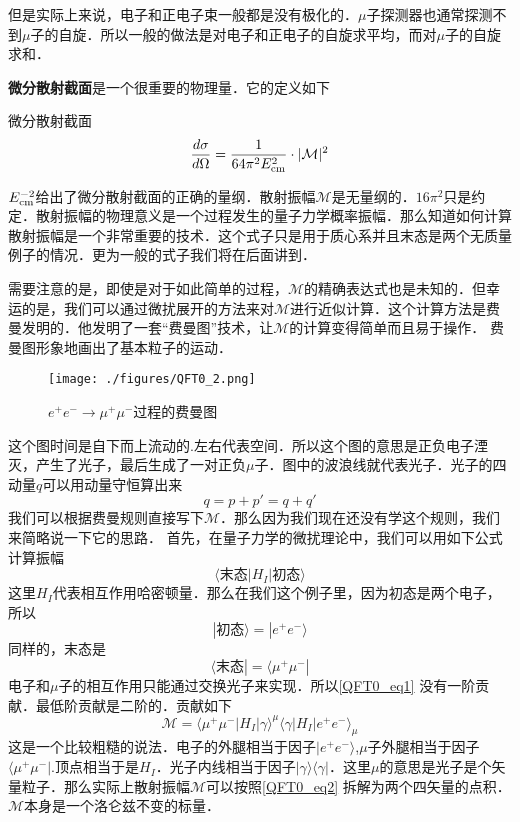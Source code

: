 但是实际上来说，电子和正电子束一般都是没有极化的．$\mu$子探测器也通常探测不到$\mu$子的自旋．所以一般的做法是对电子和正电子的自旋求平均，而对$\mu$子的自旋求和．

\textbf{微分散射截面}是一个很重要的物理量．它的定义如下
\begin{definition}{微分散射截面}
\begin{equation}
\frac{d\sigma}{d\Omega} = \frac{1}{64\pi^2E_{\rm cm}^2}\cdot |\mathcal M|^2
\end{equation}
\end{definition}
$E_{\rm cm}^{-2}$给出了微分散射截面的正确的量纲．散射振幅$\mathcal M$是无量纲的．$16\pi^2$只是约定．散射振幅的物理意义是一个过程发生的量子力学概率振幅．那么知道如何计算散射振幅是一个非常重要的技术．这个式子只是用于质心系并且末态是两个无质量例子的情况．更为一般的式子我们将在后面讲到．

需要注意的是，即使是对于如此简单的过程，$\mathcal M$的精确表达式也是未知的．但幸运的是，我们可以通过微扰展开的方法来对$\mathcal M$进行近似计算．这个计算方法是费曼发明的．他发明了一套“费曼图”技术，让$\mathcal M$的计算变得简单而且易于操作．
费曼图形象地画出了基本粒子的运动．

\begin{figure}[ht]
\centering
\texttt{[image: ./figures/QFT0\_2.png]}
\caption{$e^+e^-\rightarrow\mu^+\mu^-$过程的费曼图} \label{QFT0_fig2}
\end{figure}

这个图时间是自下而上流动的.左右代表空间．所以这个图的意思是正负电子湮灭，产生了光子，最后生成了一对正负$\mu$子．图中的波浪线就代表光子．光子的四动量$q$可以用动量守恒算出来
\begin{equation}
q=p+p'=q+q'
\end{equation}
我们可以根据费曼规则直接写下$\mathcal M$．那么因为我们现在还没有学这个规则，我们来简略说一下它的思路． 首先，在量子力学的微扰理论中，我们可以用如下公式计算振幅
\begin{equation} \label{QFT0_eq1}
\langle \text{末态} |H_I| \text{初态} \rangle
\end{equation}
这里$H_I$代表相互作用哈密顿量．那么在我们这个例子里，因为初态是两个电子，所以
\begin{equation}
| \text{初态} \rangle = | e^+ e^- \rangle
\end{equation}
同样的，末态是
\begin{equation}
\langle \text{末态} | = \langle \mu^+ \mu^- |
\end{equation}
电子和$\mu$子的相互作用只能通过交换光子来实现．所以\autoref{QFT0_eq1} 没有一阶贡献．最低阶贡献是二阶的．贡献如下
\begin{equation}\label{QFT0_eq2}
\mathcal M = \langle \mu^+ \mu^- | H_I | \gamma \rangle^\mu \langle \gamma | H_I | e^+ e^- \rangle_\mu 
\end{equation}
这是一个比较粗糙的说法．电子的外腿相当于因子$| e^+ e^- \rangle $,$\mu$子外腿相当于因子$\langle \mu^+ \mu^- |$.顶点相当于是$H_I$．光子内线相当于因子$|\gamma\rangle\langle\gamma|$．这里$\mu$的意思是光子是个矢量粒子．那么实际上散射振幅$\mathcal M$可以按照\autoref{QFT0_eq2} 拆解为两个四矢量的点积．$\mathcal M$本身是一个洛仑兹不变的标量．

